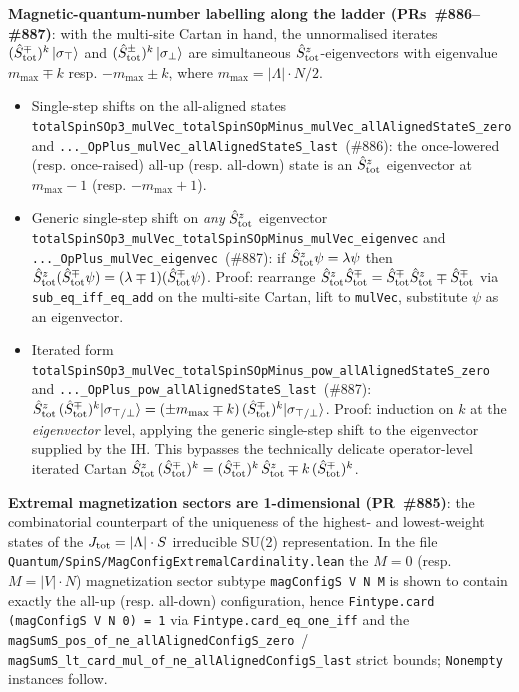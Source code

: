 \documentclass[a4paper,11pt]{article}
\begin{document}
\textbf{Magnetic-quantum-number labelling along the ladder
(PRs~\#886--\#887)}: with the multi-site Cartan in hand, the
unnormalised iterates $(\hat S^\mp_{\rm tot})^k\,|\sigma_\top\rangle$
and $(\hat S^\pm_{\rm tot})^k\,|\sigma_\bot\rangle$ are simultaneous
$\hat S^z_{\rm tot}$-eigenvectors with eigenvalue $m_{\max}\mp k$ resp.
$-m_{\max}\pm k$, where $m_{\max} = |\Lambda|\cdot N/2$.
\begin{itemize}
\item Single-step shifts on the all-aligned states
  \texttt{totalSpinSOp3\_mulVec\_totalSpinSOpMinus\_mulVec\_allAlignedStateS\_zero}
  and \texttt{...\_OpPlus\_mulVec\_allAlignedStateS\_last}~(\#886):
  the once-lowered (resp. once-raised) all-up (resp. all-down)
  state is an $\hat S^z_{\rm tot}$ eigenvector at $m_{\max}-1$
  (resp. $-m_{\max}+1$).
\item Generic single-step shift on \emph{any} $\hat S^z_{\rm tot}$
  eigenvector
  \texttt{totalSpinSOp3\_mulVec\_totalSpinSOpMinus\_mulVec\_eigenvec}
  and \texttt{...\_OpPlus\_mulVec\_eigenvec}~(\#887): if
  $\hat S^z_{\rm tot}\psi = \lambda\psi$ then
  $\hat S^z_{\rm tot}(\hat S^\mp_{\rm tot}\psi) = (\lambda\mp 1)
   (\hat S^\mp_{\rm tot}\psi)$. Proof: rearrange
  $\hat S^z_{\rm tot}\hat S^\mp_{\rm tot} = \hat S^\mp_{\rm tot}
   \hat S^z_{\rm tot}\mp\hat S^\mp_{\rm tot}$ via
  \texttt{sub\_eq\_iff\_eq\_add} on the multi-site Cartan, lift to
  \texttt{mulVec}, substitute $\psi$ as an eigenvector.
\item Iterated form
  \texttt{totalSpinSOp3\_mulVec\_totalSpinSOpMinus\_pow\_allAlignedStateS\_zero}
  and \texttt{...\_OpPlus\_pow\_allAlignedStateS\_last}~(\#887):
  $\hat S^z_{\rm tot}\,(\hat S^\mp_{\rm tot})^k|\sigma_{\top/\bot}\rangle
   = (\pm m_{\max}\mp k)\,(\hat S^\mp_{\rm tot})^k
     |\sigma_{\top/\bot}\rangle$. Proof: induction on $k$ at the
  \emph{eigenvector} level, applying the generic single-step shift
  to the eigenvector supplied by the IH. This bypasses the
  technically delicate operator-level iterated Cartan
  $\hat S^z_{\rm tot}\,(\hat S^\mp_{\rm tot})^k =
   (\hat S^\mp_{\rm tot})^k\,\hat S^z_{\rm tot} \mp
   k\,(\hat S^\mp_{\rm tot})^k$.
\end{itemize}

\textbf{Extremal magnetization sectors are 1-dimensional
(PR~\#885)}: the combinatorial counterpart of the uniqueness of the
highest- and lowest-weight states of the $J_{\rm tot}=|\Lambda|\cdot S$
irreducible SU(2) representation. In the file
\texttt{Quantum/SpinS/MagConfigExtremalCardinality.lean} the
$M=0$ (resp. $M=|V|\cdot N$) magnetization sector subtype
\texttt{magConfigS V N M} is shown to contain exactly the
all-up (resp. all-down) configuration, hence
\texttt{Fintype.card (magConfigS V N 0) = 1} via
\texttt{Fintype.card\_eq\_one\_iff} and the
\texttt{magSumS\_pos\_of\_ne\_allAlignedConfigS\_zero}~/
\texttt{magSumS\_lt\_card\_mul\_of\_ne\_allAlignedConfigS\_last}
strict bounds; \texttt{Nonempty} instances follow.
\end{document}

